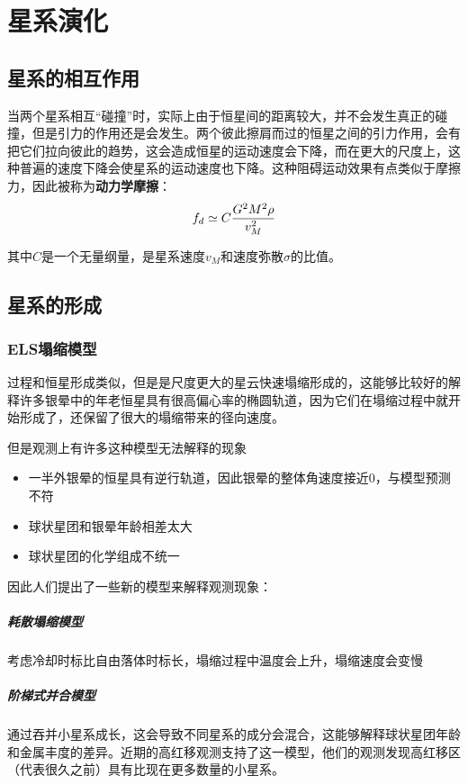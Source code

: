 \documentclass[openany]{ctexbook}
\begin{document}
\chapter{星系演化}
\section{星系的相互作用}
当两个星系相互``碰撞''时，实际上由于恒星间的距离较大，并不会发生真正的碰撞，但是引力的作用还是会发生。两个彼此擦肩而过的恒星之间的引力作用，会有把它们拉向彼此的趋势，这会造成恒星的运动速度会下降，而在更大的尺度上，这种普遍的速度下降会使星系的运动速度也下降。这种阻碍运动效果有点类似于摩擦力，因此被称为\textbf{动力学摩擦}：
\begin{equation}
  f_d\simeq C{G^2M^2\rho \over v_M^2}
\end{equation}

其中$C$是一个无量纲量，是星系速度$v_M$和速度弥散$\sigma$的比值。

\section{星系的形成}
\subsection{ELS塌缩模型}
过程和恒星形成类似，但是是尺度更大的星云快速塌缩形成的，这能够比较好的解释许多银晕中的年老恒星具有很高偏心率的椭圆轨道，因为它们在塌缩过程中就开始形成了，还保留了很大的塌缩带来的径向速度。

但是观测上有许多这种模型无法解释的现象
\begin{itemize}
  \item 一半外银晕的恒星具有逆行轨道，因此银晕的整体角速度接近0，与模型预测不符
  \item 球状星团和银晕年龄相差太大
  \item 球状星团的化学组成不统一
\end{itemize}

因此人们提出了一些新的模型来解释观测现象：
\paragraph{耗散塌缩模型}
考虑冷却时标比自由落体时标长，塌缩过程中温度会上升，塌缩速度会变慢

\paragraph{阶梯式并合模型}
通过吞并小星系成长，这会导致不同星系的成分会混合，这能够解释球状星团年龄和金属丰度的差异。近期的高红移观测支持了这一模型，他们的观测发现高红移区（代表很久之前）具有比现在更多数量的小星系。
\end{document}
